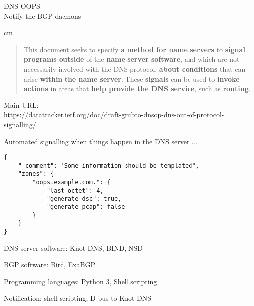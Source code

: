 \documentclass[Screen16to9,17pt]{foils}
\begin{document}
{}

\mytitlepage
{DNS OOPS\\\small Notify the BGP daemons}

\LogoOn

 cm


\begin{quote}

   This document seeks to specify {\bf a method for name servers} to {\bf signal
   programs outside} of the {\bf name server software}, and which are not
   necessarily involved with the DNS protocol, {\bf about conditions} that can
   arise {\bf within the name server}.  These {\bf signals} can be used to {\bf invoke
   actions} in areas that {\bf help provide the DNS service}, such as {\bf routing}.

\end{quote}

Main URL:\\
\url{https://datatracker.ietf.org/doc/draft-grubto-dnsop-dns-out-of-protocol-signalling/}
\begin{list1}
\item
\end{list1}



Automated signalling when things happen in the DNS server ...


\begin{verbatim}
{
    "_comment": "Some information should be templated",
    "zones": {
        "oops.example.com.": {
            "last-octet": 4,
            "generate-dsc": true,
            "generate-pcap": false
        }
    }
}
\end{verbatim}




\begin{list2}
\item DNS server software: Knot DNS, BIND, NSD
\item BGP software: Bird, ExaBGP
\item Programming languages: Python 3, Shell scripting
\item Notification: shell scripting, D-bus to Knot DNS
\end{list2}
\end{document}
